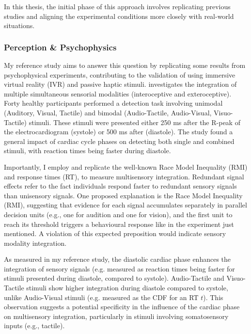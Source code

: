 \documentclass[12pt,oneside,openright]{report}
\begin{document}
In this thesis, the initial phase of this approach involves replicating previous studies and aligning the experimental conditions more closely with real-world situations.

\subsubsection*{Perception \& Psychophysics}

My reference study aims to answer this question by replicating some results from psychophysical experiments, contributing to the validation of using immersive virtual reality (IVR) and passive haptic stimuli. \textcite{SALTAFOSSI2023108642} investigates the integration of multiple simultaneous sensorial modalities (interoceptive and exteroceptive). Forty healthy participants performed a detection task involving unimodal (Auditory, Visual, Tactile) and bimodal (Audio-Tactile, Audio-Visual, Visuo-Tactile) stimuli. These stimuli were presented either 250 ms after the R-peak of the electrocardiogram (systole) or 500 ms after (diastole). The study found a general impact of cardiac cycle phases on detecting both single and combined stimuli, with reaction times being faster during diastole.

Importantly, I employ and replicate the well-known Race Model Inequality (RMI) and response times (RT), to measure multisensory integration. Redundant signal effects refer to the fact individuals respond faster to redundant sensory signals than unisensory signals. One proposed explanation is the Race Model Inequality (RMI), suggesting that evidence for each signal accumulates separately in parallel decision units (e.g., one for audition and one for vision), and the first unit to reach its threshold triggers a behavioural response like in the experiment just mentioned. A violation of this expected preposition would indicate sensory modality integration. 

As measured in my reference study, the diastolic cardiac phase enhances the integration of sensory signals (e.g. measured as reaction times being faster for stimuli presented during diastole, compared
to systole). Audio-Tactile and Visuo-Tactile stimuli show higher integration during diastole compared to systole, unlike Audio-Visual stimuli (e.g. measured as the CDF for an RT $t$). This observation suggests a potential specificity in the influence of the cardiac phase on multisensory integration, particularly in stimuli involving somatosensory inputs (e.g., tactile).
\end{document}
